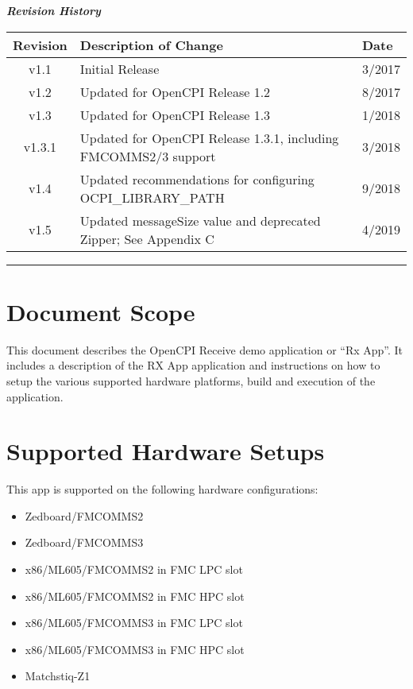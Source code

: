 	\begin{center}
	\textit{\textbf{Revision History}}
		\begin{table}[H]
		\label{table:revisions} %
			\begin{tabularx}{\textwidth}{|c|X|l|}
			\hline
			\rowcolor{blue}
			\textbf{Revision} & \textbf{Description of Change} & \textbf{Date} \\
		    \hline
		    v1.1 & Initial Release & 3/2017 \\
		    \hline
		    v1.2 & Updated for OpenCPI Release 1.2 & 8/2017 \\
			\hline
			v1.3 & Updated for OpenCPI Release 1.3 & 1/2018 \\
			\hline
			v1.3.1 & Updated for OpenCPI Release 1.3.1, including FMCOMMS2/3 support & 3/2018 \\
			\hline
			v1.4 & Updated recommendations for configuring OCPI\_LIBRARY\_PATH & 9/2018 \\
			\hline
			v1.5 & Updated messageSize value and deprecated Zipper; See Appendix C & 4/2019 \\
			\hline
			\end{tabularx}
		\end{table}
	\end{center}

\newpage
\tableofcontents
\pagebreak
\vspace{1pc}
\hrule
\section{Document Scope}
This document describes the OpenCPI Receive demo application or ``Rx App''. It includes a description of the RX App application and instructions on how to setup the various supported hardware platforms, build and execution of the application.

\section{Supported Hardware Setups}
This app is supported on the following hardware configurations:
\begin{itemize}
  \item Zedboard/FMCOMMS2
  \item Zedboard/FMCOMMS3
  \item x86/ML605/FMCOMMS2 in FMC LPC slot
  \item x86/ML605/FMCOMMS2 in FMC HPC slot
  \item x86/ML605/FMCOMMS3 in FMC LPC slot
  \item x86/ML605/FMCOMMS3 in FMC HPC slot
  \item Matchstiq-Z1
\end{itemize}

